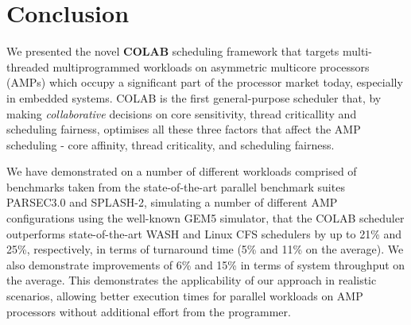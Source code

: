 \vspace{-0.1cm}
\section{Conclusion}

We presented the novel \textbf{COLAB} scheduling framework that targets multi-threaded multiprogrammed workloads on asymmetric multicore processors (AMPs) which occupy a significant part of the processor market today, especially in embedded systems. COLAB is the first general-purpose scheduler that, by making \emph{collaborative} decisions on core sensitivity, thread criticallity and scheduling fairness, optimises all these three factors that affect the AMP scheduling - core affinity, thread criticality, and scheduling fairness. %

We have demonstrated on a number of different workloads comprised of benchmarks taken from the state-of-the-art parallel benchmark suites PARSEC3.0 and SPLASH-2, simulating a number of different AMP configurations using the well-known GEM5 simulator, that the COLAB scheduler outperforms state-of-the-art WASH and Linux CFS schedulers by up to 21\% and 25\%, respectively, in terms of turnaround time (5\% and 11\% on the average). We also demonstrate improvements of 6\% and 15\% in terms of system throughput on the average. This demonstrates the applicability of our approach in realistic scenarios, allowing better execution times for parallel workloads on AMP processors without additional effort from the programmer.

